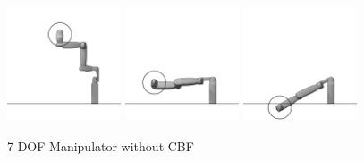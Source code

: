 \begin{figure}[H]
    \centering
    \includegraphics[width=0.3\textwidth]{Figures/Examples/7DOF/Frame0.png}
    \includegraphics[width=0.3\textwidth]{Figures/Examples/7DOF/Frame56NOCBF.png}
    \includegraphics[width=0.3\textwidth]{Figures/Examples/7DOF/Frame300NOCBF.png}
    \caption{7-DOF Manipulator without CBF}
    \label{fig:7dofnocbf2}
\end{figure}

